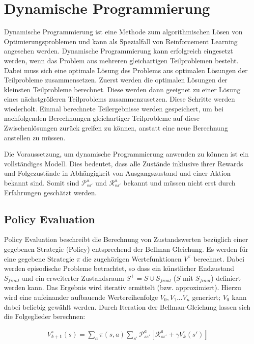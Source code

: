 \documentclass[10pt]{scrartcl}
\begin{document}
\section{Dynamische Programmierung}

Dynamische Programmierung ist eine Methode zum algorithmischen Lösen von Optimierungsproblemen und kann als Spezialfall von Reinforcement Learning angesehen werden. Dynamische Programmierung kann erfolgreich eingesetzt werden, wenn das Problem aus mehreren gleichartigen Teilproblemen besteht. Dabei muss sich eine optimale Lösung des Problems aus optimalen Lösungen der Teilprobleme zusammensetzen. Zuerst werden die optimalen Lösungen der kleinsten Teilprobleme berechnet. Diese werden dann geeignet zu einer Lösung eines nächstgrößeren Teilproblems zusammenzusetzen. Diese Schritte werden wiederholt. Einmal berechnete Teilergebnisse werden gespeichert, um bei nachfolgenden Berechnungen gleichartiger Teilprobleme auf diese Zwischenlösungen zurück greifen zu können, anstatt eine neue Berechnung anstellen zu müssen. 

Die Voraussetzung, um dynamische Programmierung anwenden zu können ist ein vollständiges Modell. Dies bedeutet, dass alle Zustände inklusive ihrer Rewards und Folgezustände in Abhängigkeit von Ausgangszustand und einer Aktion bekannt sind.
Somit sind $\mathcal{P}^{a}_{ss'}$ und $\mathcal{R}^{a}_{ss'}$ bekannt und müssen nicht erst durch Erfahrungen geschätzt werden.

\subsection{Policy Evaluation}
Policy Evaluation beschreibt die Berechnung von Zustandswerten bezüglich einer gegebenen Strategie (Policy) entsprechend der Bellman-Gleichung. Es werden für eine gegebene Strategie $\pi$ die zugehörigen Wertefunktionen $V^{\pi}$ berechnet. Dabei werden episodische Probleme betrachtet, so dass ein künstlicher Endzustand $S_{final}$  und ein erweiterter Zustandsraum $S^+=S\cup{S_{final}}$ ($S$ mit $S_{final}$) definiert werden kann. Das Ergebnis wird iterativ ermittelt (bzw. approximiert). Hierzu wird eine aufeinander aufbauende Wertereihenfolge $V_0, V_1 ... V_n$ generiert; $V_0$ kann dabei beliebig gewählt werden. Durch Iteration der Bellman-Gleichung lassen sich die Folgeglieder berechnen:

\begin{align*}
V^\pi_{k+1}(s) = \sum\limits_{a} \pi(s,a) \sum\limits_{s'}\mathcal{P}^a_{ss'}[\mathcal{R}^a_{ss'}+\gamma V^\pi_k(s')]
\end{align*}
\end{document}
